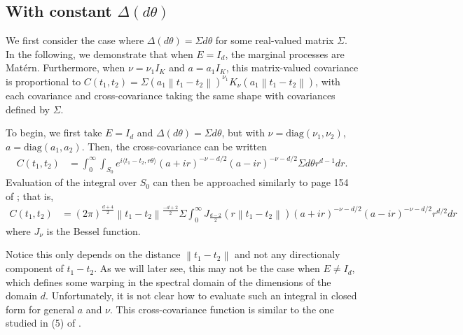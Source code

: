 \documentclass[11pt]{article}
\begin{document}
\subsection{With constant $\Delta(d\theta)$}

We first consider the case where $\Delta(d\theta) = \Sigma d\theta$ for some real-valued matrix $\Sigma$. In the following, we demonstrate that when $E = I_d$, the marginal processes are Mat\'ern. Furthermore, when $\nu = \nu_1 I_K$ and $a = a_1 I_K$, this matrix-valued covariance is proportional to $C(t_1,t_2)= \Sigma  (a_1\left\lVert t_1 - t_2\right\rVert)^{\nu_1} K_\nu(a_1\left\lVert t_1 - t_2\right\rVert)$, with each covariance and cross-covariance taking the same shape with covariances defined by $\Sigma$. 

To begin, we first take $E = I_d$ and $\Delta(d\theta) = \Sigma d\theta$, but with $\nu = \textrm{diag}(\nu_1, \nu_2)$, $a = \textrm{diag}(a_1, a_2)$. 
Then, the cross-covariance can be written \begin{align*}
C(t_1, t_2)&=\int_0^\infty \int_{S_0} e^{i\langle t_1 - t_2, r\theta\rangle}(a + ir)^{-\nu-d/2}(a - ir)^{-\nu-d/2} \Sigma d\theta r^{d-1} dr.
\end{align*}
Evaluation of the integral over $S_0$ can then be approached similarly to page 154 of \cite{stein_introduction_1975}; that is, \begin{align}
C(t_1, t_2)&=(2\pi)^{\frac{d+4}{2}}\left\lVert t_1 - t_2\right\rVert^{\frac{-d+2}{2}}\Sigma\int_0^\infty  J_{\frac{d-2}{2}}(r\left\lVert t_1 - t_2\right\rVert)(a + ir)^{-\nu-d/2}(a - ir)^{-\nu-d/2} r^{d/2} dr \label{eq:bessel_integral}
\end{align}where $J_\nu$ is the Bessel function. 

Notice this only depends on the distance $\left\lVert t_1 - t_2\right\rVert$ and not any directionaly component of $t_1 - t_2$. As we will later see, this may not be the case when $E\neq I_d$, which defines some warping in the spectral domain of the dimensions of the domain $d$.  Unfortunately, it is not clear how to evaluate such an integral in closed form for general $a$ and $\nu$. This cross-covariance function is similar to the one studied in (5) of \cite{bolin_multivariate_nodate}.

\end{document}
